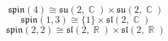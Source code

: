 \documentclass[12 pt]{article}
\DeclareMathOperator {\R} {\mathbb{R}}
\DeclareMathOperator {\C} {\mathbb{C}}
\begin{document}
\[          \mathfrak{spin}(4) \cong  \mathfrak{su}(2,\C) \times \mathfrak{su}(2,\C)                   \]
\[          \mathfrak{spin}(1,3) \cong  \{1\} \times \mathfrak{sl}(2,\C)                   \]
\[          \mathfrak{spin}(2,2) \cong  \mathfrak{sl}(2,\R) \times \mathfrak{sl}(2,\R)                   \]
\end{document}
